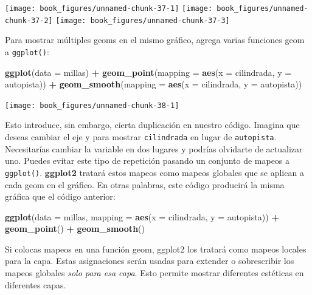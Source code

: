 \documentclass[11pt,oneside]{report}
\newenvironment{Shaded}{\begin{snugshade}}{\end{snugshade}}
\newcommand{\DataTypeTok}[1]{\textcolor[rgb]{0.13,0.29,0.53}{#1}}
\newcommand{\KeywordTok}[1]{\textcolor[rgb]{0.13,0.29,0.53}{\textbf{#1}}}
\newcommand{\NormalTok}[1]{#1}
\newcommand{\OperatorTok}[1]{\textcolor[rgb]{0.81,0.36,0.00}{\textbf{#1}}}
\newcommand{\StringTok}[1]{\textcolor[rgb]{0.31,0.60,0.02}{#1}}
\begin{document}
\texttt{[image: book\_figures/unnamed-chunk-37-1]}
\texttt{[image: book\_figures/unnamed-chunk-37-2]}
\texttt{[image: book\_figures/unnamed-chunk-37-3]}

Para mostrar múltiples geoms en el mismo gráfico, agrega varias
funciones geom a \texttt{ggplot()}:

\begin{Shaded}
\begin{Highlighting}[]
\KeywordTok{ggplot}\NormalTok{(}\DataTypeTok{data =}\NormalTok{ millas) }\OperatorTok{+}
\StringTok{ }\KeywordTok{geom_point}\NormalTok{(}\DataTypeTok{mapping =} \KeywordTok{aes}\NormalTok{(}\DataTypeTok{x =}\NormalTok{ cilindrada, }\DataTypeTok{y =}\NormalTok{ autopista)) }\OperatorTok{+}
\StringTok{ }\KeywordTok{geom_smooth}\NormalTok{(}\DataTypeTok{mapping =} \KeywordTok{aes}\NormalTok{(}\DataTypeTok{x =}\NormalTok{ cilindrada, }\DataTypeTok{y =}\NormalTok{ autopista))}
\end{Highlighting}
\end{Shaded}

\begin{center}\texttt{[image: book\_figures/unnamed-chunk-38-1]} \end{center}

Esto introduce, sin embargo, cierta duplicación en nuestro código.
Imagina que deseas cambiar el eje y para mostrar \texttt{cilindrada} en
lugar de \texttt{autopista}. Necesitarías cambiar la variable en dos
lugares y podrías olvidarte de actualizar uno. Puedes evitar este tipo
de repetición pasando un conjunto de mapeos a \texttt{ggplot()}.
\textbf{ggplot2} tratará estos mapeos como mapeos globales que se
aplican a cada geom en el gráfico. En otras palabras, este código
producirá la misma gráfica que el código anterior:

\begin{Shaded}
\begin{Highlighting}[]
\KeywordTok{ggplot}\NormalTok{(}\DataTypeTok{data =}\NormalTok{ millas, }\DataTypeTok{mapping =} \KeywordTok{aes}\NormalTok{(}\DataTypeTok{x =}\NormalTok{ cilindrada, }\DataTypeTok{y =}\NormalTok{ autopista)) }\OperatorTok{+}
\StringTok{  }\KeywordTok{geom_point}\NormalTok{() }\OperatorTok{+}
\StringTok{  }\KeywordTok{geom_smooth}\NormalTok{()}
\end{Highlighting}
\end{Shaded}

Si colocas mapeos en una función geom, ggplot2 los tratará como mapeos
locales para la capa. Estas asignaciones serán usadas para extender o
sobrescribir los mapeos globales \emph{solo para esa capa}. Esto permite
mostrar diferentes estéticas en diferentes capas.
\end{document}
